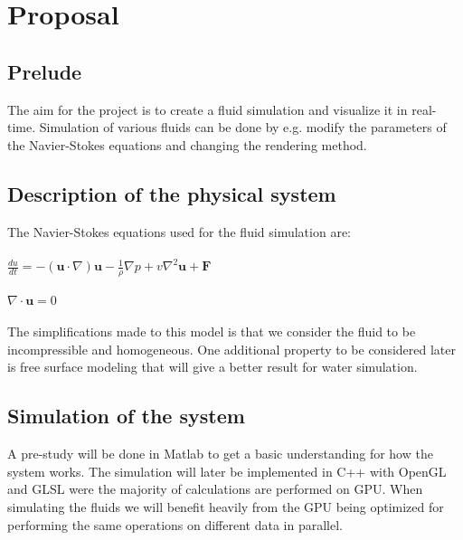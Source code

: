 \documentclass[a4paper,12pt,twoside,swedish]{report}
\begin{document}
\pagestyle{plain}

\setcounter{page}{1}

\chapter{Proposal}

\section{Prelude}
The aim for the project is to create a fluid simulation and visualize it in real-time. Simulation of various fluids can be done by e.g. modify the parameters of the Navier-Stokes equations and changing the rendering method.

\section{Description of the physical system}
The Navier-Stokes equations used for the fluid simulation are:\\\\
\(\frac{du}{dt} = - (\textbf{u}\cdot{\nabla})\textbf{u} - \frac{1}{\rho}\nabla p + v \nabla^2 \textbf{u} + \textbf{F}\) \\\\
\(\nabla \cdot \textbf{u} = 0 \)\\\\
The simplifications made to this model is that we consider the fluid to be incompressible and homogeneous. One additional property to be considered later is free surface modeling that will give a better result for water simulation.

\section{Simulation of the system}
A pre-study will be done in Matlab to get a basic understanding for how the system works. The simulation will later be implemented in C++ with OpenGL and GLSL were the majority of calculations are performed on GPU. When simulating the fluids we will benefit heavily from the GPU being optimized for performing the same operations on different data in parallel.
\end{document}
